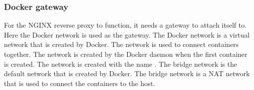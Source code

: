 \subsubsection{Docker gateway}
\label{sec:gateway}
For the NGINX reverse proxy to function, it needs a gateway to attach itself to. Here the Docker network is used as the gateway.
The Docker network is a virtual network that is created by Docker. The network is used to connect containers together.
The network is created by the Docker daemon when the first container is created. The network is created with the name .
The bridge network is the default network that is created by Docker.
The bridge network is a \ac{NAT} network that is used to connect the containers to the host.